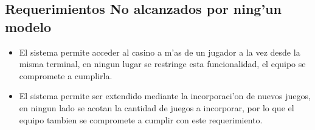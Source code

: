 \subsection{Requerimientos No alcanzados por ning'un modelo \label{RND}}

\begin{itemize}
\item {} El sistema permite acceder al casino a m'as de un jugador a la vez desde la misma terminal, en ningun lugar se restringe esta funcionalidad, el equipo se compromete a cumplirla.
\item {} El sistema permite ser extendido mediante la incorporaci'on de nuevos juegos, en ningun lado se acotan la cantidad de juegos a incorporar, por lo que el equipo tambien se compromete a cumplir con este requerimiento.

 
\end{itemize}
